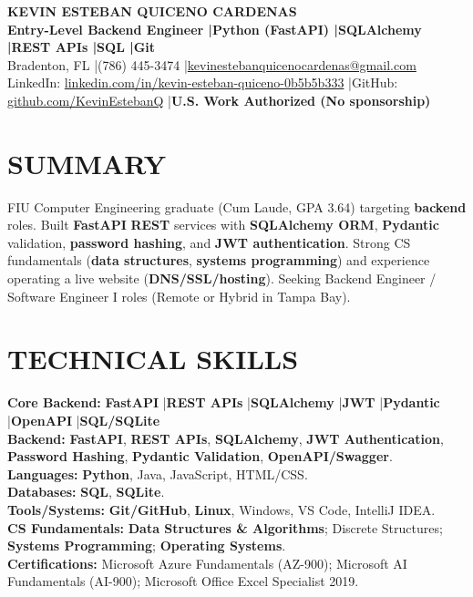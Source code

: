 \documentclass[10pt]{article}
\newcommand{\sep}{\;\;|\;\;}
\newcommand{\skill}[2]{\textbf{#1:} #2}
\begin{document}
{\Large \textbf{KEVIN ESTEBAN QUICENO CARDENAS}}\\
\textbf{Entry-Level Backend Engineer \sep \textbf{Python (FastAPI)} \sep \textbf{SQLAlchemy} \sep \textbf{REST APIs} \sep \textbf{SQL} \sep \textbf{Git}}\\
Bradenton, FL \sep (786) 445-3474 \sep \href{mailto:kevinestebanquicenocardenas@gmail.com}{kevinestebanquicenocardenas@gmail.com}\\
LinkedIn: \href{https://linkedin.com/in/kevin-esteban-quiceno-0b5b5b333}{linkedin.com/in/kevin-esteban-quiceno-0b5b5b333}
\sep GitHub: \href{https://github.com/KevinEstebanQ}{github.com/KevinEstebanQ}
\sep \textbf{U.S. Work Authorized (No sponsorship)}

\vspace{2pt}

\section{SUMMARY}
\small
FIU Computer Engineering graduate (Cum Laude, GPA 3.64) targeting \textbf{backend} roles. Built \textbf{FastAPI} \textbf{REST} services with \textbf{SQLAlchemy ORM}, \textbf{Pydantic} validation, \textbf{password hashing}, and \textbf{JWT authentication}. Strong CS fundamentals (\textbf{data structures}, \textbf{systems programming}) and experience operating a live website (\textbf{DNS/SSL/hosting}). Seeking Backend Engineer / Software Engineer I roles (Remote or Hybrid in Tampa Bay).
\normalsize

\section{TECHNICAL SKILLS}
\small
\skill{Core Backend}{\textbf{FastAPI} \sep \textbf{REST APIs} \sep \textbf{SQLAlchemy} \sep \textbf{JWT} \sep \textbf{Pydantic} \sep \textbf{OpenAPI} \sep \textbf{SQL/SQLite}}\\
\skill{Backend}{\textbf{FastAPI}, \textbf{REST APIs}, \textbf{SQLAlchemy}, \textbf{JWT Authentication}, \textbf{Password Hashing}, \textbf{Pydantic Validation}, \textbf{OpenAPI/Swagger}.}\\
\skill{Languages}{\textbf{Python}, Java, JavaScript, HTML/CSS.}\\
\skill{Databases}{\textbf{SQL}, \textbf{SQLite}.}\\
\skill{Tools/Systems}{\textbf{Git/GitHub}, \textbf{Linux}, Windows, VS Code, IntelliJ IDEA.}\\
\skill{CS Fundamentals}{\textbf{Data Structures \& Algorithms}; Discrete Structures; \textbf{Systems Programming}; \textbf{Operating Systems}.}\\
\skill{Certifications}{Microsoft Azure Fundamentals (AZ-900); Microsoft AI Fundamentals (AI-900); Microsoft Office Excel Specialist 2019.}
\normalsize
\end{document}
